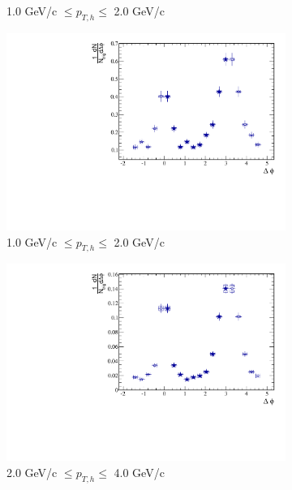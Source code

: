\begin{figure}[htbp]
\begin{subfigure}{0.5\textwidth}
		\caption{1.0 GeV/c $\leq p_{T,h} \leq$ 2.0 GeV/c}
		\label{fig:ppcorrc}
	\end{subfigure}	
	\begin{subfigure}{0.5\textwidth}
		\includegraphics[width=.9\textwidth]{Plots/Correlations/pp/pp_NPE_h_corr_primpt_6_8_assopt_2_2.pdf}
		\caption{1.0 GeV/c $\leq p_{T,h} \leq$ 2.0 GeV/c}
		\label{fig:ppcorrd}
	\end{subfigure}	
	\begin{subfigure}{0.5\textwidth}
		\includegraphics[width=.9\textwidth]{Plots/Correlations/pp/pp_NPE_h_corr_primpt_4_5_assopt_3_4.pdf}
		\caption{2.0 GeV/c $\leq p_{T,h} \leq$ 4.0 GeV/c}
		\label{fig:ppcorre}
	\end{subfigure}	
	\begin{subfigure}{0.5\textwidth}

\end{subfigure}
\end{figure}
